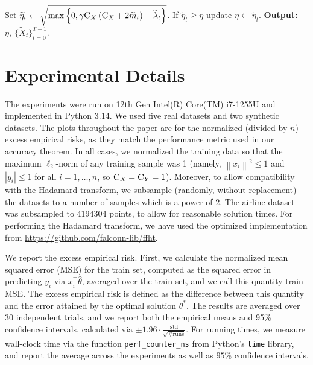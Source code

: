 \documentclass[11pt]{article}
\theoremstyle{definition}
\theoremstyle{plain}
\newcommand{\abs}[1]{\left| #1 \right|}
\newcommand{\Norm}[1]{\left\| #1 \right\|}
\providecommand{\norm}[1]{\Norm{#1}}
\begin{document}
\begin{algorithm}[H]
\begin{algorithmic}[1]
            \State Set $\widetilde{\eta}_t \gets \sqrt{\max\left\{0, \gamma\textsc{C}_{X}\left(\textsc{C}_{X} + 2\widetilde{m}_t\right) - \widetilde{\lambda}_t\right\}}$.
            \State If $\widetilde{\eta}_t \geq \eta$ update $\eta \gets \widetilde{\eta}_t$. 
        \EndFor 
        \State \textbf{Output:} $\eta, \ \{\widetilde{X}_{t}\}^{T-1}_{t=0}$. 
    \end{algorithmic}
\end{algorithm}

\section{Experimental Details}
\label{app:exp_details}
The experiments were run on 12th Gen Intel(R) Core(TM) i7-1255U and implemented in Python 3.14. We used five real datasets and two synthetic datasets. The plots throughout the paper are for the normalized (divided by $n$) excess empirical risks, as they match the performance metric used in our accuracy theorem. In all cases, we normalized the training data so that the maximum \( \ell_2 \)-norm of any training sample was 1 (namely, $\norm{x_i}^2 \leq 1$ and $\abs{y_i} \leq 1$ for all $i =1,\ldots, n$, so $\textsc{C}_X = \textsc{C}_Y = 1$). Moreover, to allow compatibility with the Hadamard transform, we subsample (randomly, without replacement) the datasets to a number of samples which is a power of $2$. The airline dataset was subsampled to $4194304$ points, to allow for reasonable solution times. For performing the Hadamard transform, we have used the optimized implementation from \url{https://github.com/falconn-lib/ffht}.

We report the excess empirical risk. First, we calculate the normalized mean squared error (MSE) for the train set, computed as the squared error in predicting \( y_i \) via \( x_i^{\top} \widehat{\theta} \), averaged over the train set, and we call this quantity train MSE. The excess empirical risk is defined as the difference between this quantity and the error attained by the optimal solution $\theta^{*}$. The results are averaged over $30$ independent trials, and we report both the empirical means and 95\% confidence intervals, calculated via $\pm 1.96 \cdot \frac{\mathrm{std}}{\sqrt{\# \mathrm{runs}}}$. For running times, we measure wall-clock time via the function \texttt{perf\_counter\_ns} from Python's \texttt{time} library, and report the average across the experiments as well as $95$\% confidence intervals.  
\end{document}
